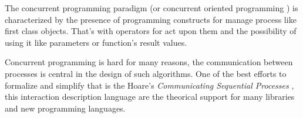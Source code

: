 
The concurrent programming paradigm (or concurrent oriented programming \cite{Armstrong2003}) is characterized by the presence of programming constructs for manage process like first class objects. That’s with operators for act upon them and the possibility of using it like parameters or function's result values.

Concurrent programming is hard for many reasons, the communication between processes is central in the design of such algorithms. One of the best efforts to formalize and simplify that is the Hoare’s {\em Communicating Sequential Processes} \cite{Hoare:1978:CSP:359576.359585}, this interaction description language are the theorical support for many libraries  and new programming languages. 